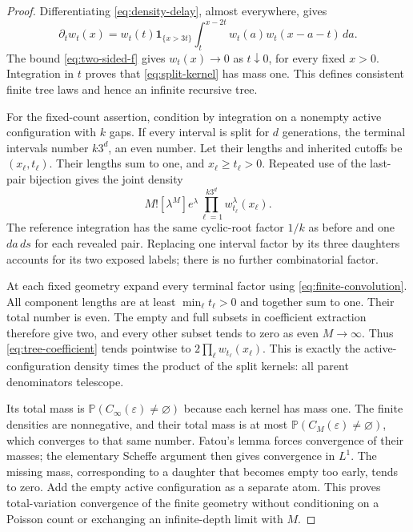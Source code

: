 \documentclass[11pt,letterpaper]{article}
\newcommand{\PP}{\mathbb P}\newcommand{\EE}{\mathbb E}
\newcommand{\ind}{\mathbf 1}\newcommand{\Exp}{\operatorname{Exp}}
\begin{document}
\begin{proof}
Differentiating \eqref{eq:density-delay}, almost everywhere, gives
\[
 \partial_t w_t(x)=w_t(t)\ind_{\{x>3t\}}
                 \int_t^{x-2t}w_t(a)w_t(x-a-t)\,da.
\]
The bound \eqref{eq:two-sided-f} gives $w_t(x)\to0$ as $t\downarrow0$,
for every fixed $x>0$. Integration in $t$ proves that
\eqref{eq:split-kernel} has mass one. This defines consistent finite
tree laws and hence an infinite recursive tree.

For the fixed-count assertion, condition by integration on a nonempty
active configuration with $k$ gaps. If every interval is split for $d$
generations, the terminal intervals number $k3^d$, an even number.
Let their lengths and inherited cutoffs be $(x_\ell,t_\ell)$. Their
lengths sum to one, and $x_\ell\ge t_\ell>0$. Repeated use of the last-pair
bijection gives the joint density
\begin{equation}\label{eq:tree-coefficient}
 M![\lambda^M]e^\lambda\prod_{\ell=1}^{k3^d}
                         w_{t_\ell}^{\lambda}(x_\ell).
\end{equation}
The reference integration has the same cyclic-root factor $1/k$ as
before and one $da\,ds$ for each revealed pair. Replacing one interval
factor by its three daughters accounts for its two exposed labels;
there is no further combinatorial factor.

At each fixed geometry expand every terminal factor using
\eqref{eq:finite-convolution}. All component lengths are at least
$\min_\ell t_\ell>0$ and together sum to one. Their total number is even.
The empty and full subsets in coefficient extraction therefore give
two, and every other subset tends to zero as even $M\to\infty$.
Thus \eqref{eq:tree-coefficient} tends pointwise to
$2\prod_\ell w_{t_\ell}(x_\ell)$.
This is exactly the active-configuration density times the product of
the split kernels: all parent denominators telescope.

Its total mass is $\PP(C_\infty(\varepsilon)\ne\varnothing)$ because
each kernel has mass one. The finite densities are nonnegative, and
their total mass is at most
$\PP(C_M(\varepsilon)\ne\varnothing)$, which converges to that same
number. Fatou's lemma forces convergence of their masses; the elementary
Scheffe argument then gives convergence in $L^1$. The missing mass,
corresponding to a daughter that becomes empty too early, tends to zero.
Add the empty active configuration as a separate atom. This proves
total-variation convergence of the finite geometry without conditioning
on a Poisson count or exchanging an infinite-depth limit with $M$.
\end{proof}
\end{document}
